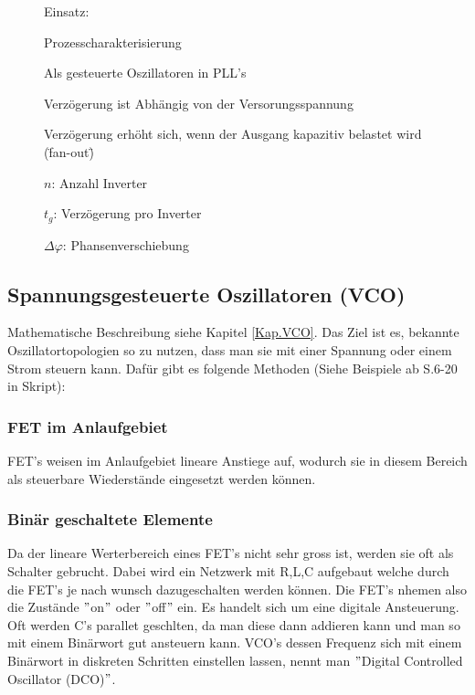 \begin{figure}[h!]
\begin{minipage}{0.5\textwidth}
\begin{compactitem}
\begin{compactitem}
        \end{compactitem}
        \item Einsatz:
        \begin{compactitem}
           \item Prozesscharakterisierung
           \item Als gesteuerte Oszillatoren in PLL's\\
        \end{compactitem}
        \item Verzögerung ist Abhängig von der Versorungsspannung
        \item Verzögerung erhöht sich, wenn der Ausgang kapazitiv belastet wird (\"fan-out\")
        \item $n$: Anzahl Inverter
        \item $t_g$: Verzögerung pro Inverter
        \item $\Delta\varphi$: Phansenverschiebung
      \end{compactitem}
	\end{minipage}
\end{figure}

\FloatBarrier
\subsection{Spannungsgesteuerte Oszillatoren (VCO)}
Mathematische Beschreibung siehe Kapitel \ref{Kap.VCO}.
Das Ziel ist es, bekannte Oszillatortopologien so zu nutzen, dass man sie mit einer Spannung oder einem Strom steuern kann. Dafür gibt es folgende Methoden (Siehe Beispiele ab S.6-20 in Skript):

\FloatBarrier
\subsubsection{FET im Anlaufgebiet}
FET's weisen im Anlaufgebiet lineare Anstiege auf, wodurch sie in diesem Bereich als steuerbare Wiederstände eingesetzt werden können.

\FloatBarrier
\subsubsection{Binär geschaltete Elemente}
Da der lineare Werterbereich eines FET's nicht sehr gross ist, werden sie oft als Schalter gebrucht. Dabei wird ein Netzwerk mit R,L,C aufgebaut welche durch die FET's je nach wunsch dazugeschalten werden können. Die FET's nhemen also die Zustände $"$on$"$ oder $"$off$"$ ein. Es handelt sich um eine digitale Ansteuerung. Oft werden C's parallet geschlten, da man diese dann addieren kann und man so mit einem Binärwort gut ansteuern kann. VCO's dessen Frequenz sich mit einem Binärwort in diskreten Schritten einstellen lassen, nennt man $"$Digital Controlled Oscillator (DCO)$"$.

